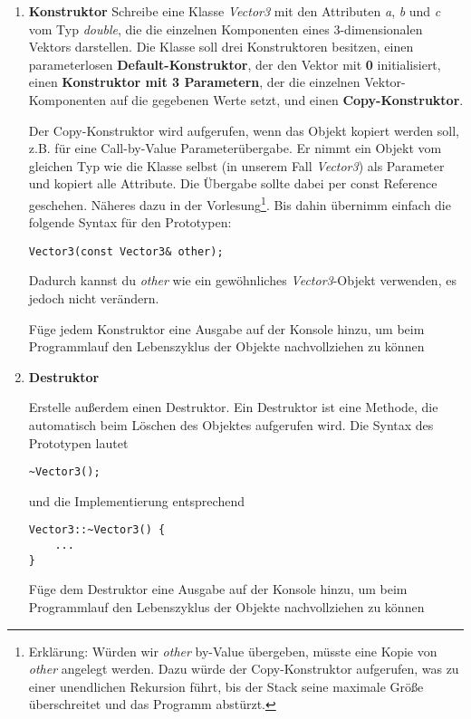 \begin{enumerate}
\item \textbf{Konstruktor}
Schreibe eine Klasse \emph{Vector3} mit den Attributen \emph{a}, \emph{b} und \emph{c} vom Typ \emph{double}, die die einzelnen Komponenten eines 3-dimensionalen Vektors darstellen.
Die Klasse soll drei Konstruktoren besitzen, einen parameterlosen \textbf{Default-Konstruktor}, der den Vektor mit \textbf{0} initialisiert, einen \textbf{Konstruktor mit 3 Parametern}, der die einzelnen Vektor-Komponenten auf die gegebenen Werte setzt, und einen \textbf{Copy-Konstruktor}.

Der Copy-Konstruktor wird aufgerufen, wenn das Objekt kopiert werden soll, z.B. für eine Call-by-Value Parameterübergabe.
Er nimmt ein Objekt vom gleichen Typ wie die Klasse selbst (in unserem Fall \emph{Vector3}) als Parameter und kopiert alle Attribute.
Die Übergabe sollte dabei per const Reference geschehen.
Näheres dazu in der Vorlesung\footnote{Erklärung: Würden wir \emph{other} by-Value übergeben, müsste eine Kopie von \emph{other} angelegt werden.
	Dazu würde der Copy-Konstruktor aufgerufen, was zu einer unendlichen Rekursion führt, bis der Stack seine maximale Größe überschreitet und das Programm abstürzt.}.
Bis dahin übernimm einfach die folgende Syntax für den Prototypen:
\begin{lstlisting}
Vector3(const Vector3& other);
\end{lstlisting} 

Dadurch kannst du \emph{other} wie ein gewöhnliches \emph{Vector3}-Objekt verwenden, es jedoch nicht verändern.

Füge jedem Konstruktor eine Ausgabe auf der Konsole hinzu, um beim Programmlauf den Lebenszyklus der Objekte nachvollziehen zu können

\item \textbf{Destruktor}

Erstelle außerdem einen Destruktor.
Ein Destruktor ist eine Methode, die automatisch beim Löschen des Objektes aufgerufen wird. Die Syntax des Prototypen lautet
\begin{lstlisting}
~Vector3();
\end{lstlisting} 

und die Implementierung entsprechend
\begin{lstlisting}
Vector3::~Vector3() {
	...
}
\end{lstlisting} 

Füge dem Destruktor eine Ausgabe auf der Konsole hinzu, um beim Programmlauf den Lebenszyklus der Objekte nachvollziehen zu können


\end{enumerate}
